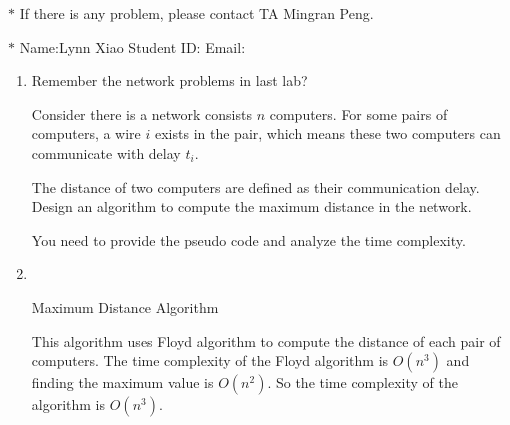 \documentclass[12pt,a4paper]{article}
\makeatletter
\newtheorem*{solution}{Solution}
\theoremstyle{definition}
\renewenvironment{solution}[1][Solution] {\par\pushQED{\qed}\normalfont\topsep6\p@\@plus6\p@\relax\trivlist\item[\hskip\labelsep\bfseries#1\@addpunct{.}]\ignorespaces}{\popQED\endtrivlist\@endpefalse} \makeatother
\makeatother
\begin{document}
\noindent

\noindent{}


\begin{center}
\footnotesize{\color{red}$*$ If there is any problem, please contact TA Mingran Peng.}\par
\footnotesize{\color{blue}$*$ Name:Lynn Xiao Student ID: \quad Email: }
\end{center}
\begin{enumerate}
    
    \item
    Remember the network problems in last lab?\par
    Consider there is a network consists $n$ computers. For some pairs of computers, a wire $i$ exists in the pair, which means these two computers can communicate with delay $t_i$.\par
The distance of two computers are defined as their communication delay. Design an algorithm to compute the maximum distance in the network.\par
You need to provide the pseudo code and analyze the time complexity.\par
\begin{solution}
	~\\
	
	 	\begin{algorithm}[H]
		\BlankLine
		\caption{Maximum Distance Algorithm}
		\label{Alg-selectionsort}
		\BlankLine
	\end{algorithm}
	
	This algorithm uses Floyd algorithm to compute the distance of each pair of computers. The time complexity of the Floyd algorithm is $O(n^3)$ and finding the maximum value is $O(n^2)$. So the time complexity of the algorithm is $O(n^3)$.
\end{solution}



\end{enumerate}
\end{document}
